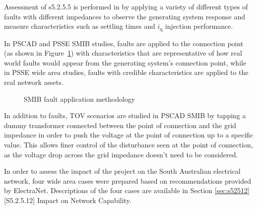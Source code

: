 Assessment of s5.2.5.5 is performed in by applying a variety of different types of faults with different impedances to observe the generating system response and measure characteristics such as settling times and $i_{\text{q}}$ injection performance. 

In PSCAD and PSSE SMIB studies, faults are applied to the connection point (as shown in Figure~\ref{fig:s5255-fault-application-methodology-diagram}) with characteristics that are representative of how real world faults would appear from the generating system's connection point, while in PSSE wide area studies, faults with credible characteristics are applied to the real network assets.

\begin{figure}[H]
	\centering
	
	\caption{SMIB fault application methodology}
	\label{fig:s5255-fault-application-methodology-diagram}
\end{figure}

In addition to faults, \ac{TOV} scenarios are studied in PSCAD SMIB by tapping a dummy transformer connected between the point of connection and the grid impedance in order to push the voltage at the point of connection up to a specific value. This allows finer control of the disturbance seen at the point of connection, as the voltage drop across the grid impedance doesn't need to be considered.

In order to assess the impact of the project on the South Australian electrical network, four wide area cases were prepared based on recommendations provided by ElectraNet. Descriptions of the four cases are available in Section \ref{sec:s52512} [S5.2.5.12] Impact on Network Capability. 

